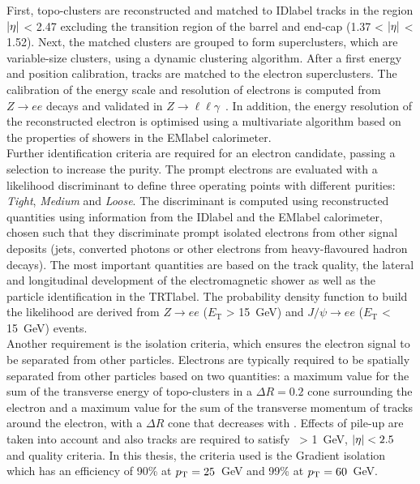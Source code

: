 First, topo-clusters are reconstructed and matched to \acrshort{IDlabel} tracks in the region $\abs{\eta}$ < 2.47 excluding the transition region of the barrel and end-cap (1.37 < $\abs{\eta}$ < 1.52). Next, the matched clusters are grouped to form superclusters, which are variable-size clusters, using a dynamic clustering algorithm. After a first energy and position calibration, tracks are matched to the electron superclusters. The calibration of the energy scale and resolution of electrons is computed from $Z\rightarrow ee$ decays and validated in $Z\rightarrow \ell\ell\gamma$~\cite{performanceEgamma}. In addition, the energy resolution of the reconstructed electron is optimised using a multivariate algorithm based on the properties of showers in the \acrshort{EMlabel} calorimeter.\\

Further identification criteria are required for an electron candidate, passing a selection to increase the purity. The prompt electrons are evaluated with a likelihood discriminant to define three operating points with different purities: \textit{Tight}, \textit{Medium} and \textit{Loose}. The discriminant is computed using reconstructed quantities using information from the \acrshort{IDlabel} and the \acrshort{EMlabel} calorimeter, chosen such that they discriminate prompt isolated electrons from other signal deposits (jets, converted photons or other electrons from heavy-flavoured hadron decays). The most important quantities are based on the track quality, the lateral and longitudinal development of the electromagnetic shower as well as the particle identification in the \acrshort{TRTlabel}. The probability density function to build the likelihood are derived from $Z\rightarrow ee$ ($E_\text{T}$ > 15~GeV) and $J/\psi \rightarrow ee$ ($E_\text{T}$ < 15~GeV) events.\\

Another requirement is the isolation criteria, which ensures the electron signal to be separated from other particles. Electrons are typically required to be spatially separated from other particles based on two quantities: a maximum value for the sum of the transverse energy of topo-clusters in a $\Delta R=0.2$ cone surrounding the electron and a maximum value for the sum of the transverse momentum of tracks around the electron, with a $\Delta R$ cone that decreases with \pT. Effects of pile-up are taken into account and also tracks are required to satisfy \pT\ > 1~GeV, $\abs{\eta}<2.5$ and quality criteria. In this thesis, the criteria used is the Gradient isolation which has an efficiency of 90\% at $p_{\text{T}} = 25$~GeV and 99\% at $p_{\text{T}} = 60$~GeV.

